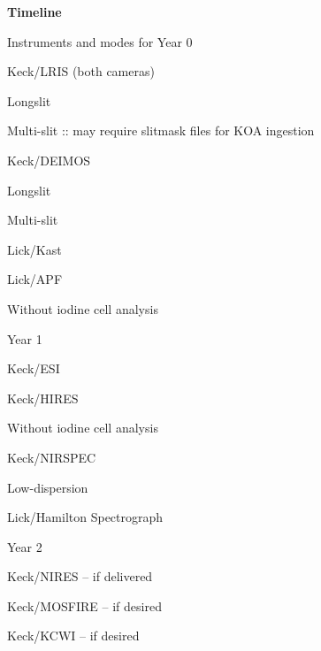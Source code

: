 \documentclass[11pt,preprint]{aastex}
\newenvironment{my_itemize}{
\begin{itemize}
  \setlength{\itemsep}{1pt}
  \setlength{\parskip}{0pt}
  \setlength{\parsep}{0pt}}{\end{itemize}
}
\newenvironment{my_enumerate}{
\begin{enumerate}
  \setlength{\itemsep}{1pt}
  \setlength{\parskip}{0pt}
  \setlength{\parsep}{0pt}}{\end{enumerate}
}
\begin{document}
\vskip 0.2in

\begin{center}
{\bf Timeline}
\end{center}

\begin{my_enumerate}
\item Instruments and modes for Year 0
  \begin{my_itemize}
  \item Keck/LRIS (both cameras)
    \begin{my_itemize}
    \item Longslit
    \item Multi-slit :: may require slitmask files for KOA ingestion
    \end{my_itemize}
  \item Keck/DEIMOS
    \begin{my_itemize}
    \item Longslit
    \item Multi-slit 
    \end{my_itemize}
  \item Lick/Kast
  \item Lick/APF
    \begin{my_itemize}
    \item Without iodine cell analysis
    \end{my_itemize}
  \end{my_itemize}
\item Year 1
  \begin{my_itemize}
  \item Keck/ESI
  \item Keck/HIRES
    \begin{my_itemize}
    \item Without iodine cell analysis
    \end{my_itemize}
  \item Keck/NIRSPEC
    \begin{my_itemize}
    \item Low-dispersion
    \end{my_itemize}
  \item Lick/Hamilton Spectrograph
  \end{my_itemize}
\item Year 2
  \begin{my_itemize}
  \item Keck/NIRES -- if delivered
  \item Keck/MOSFIRE -- if desired
  \item Keck/KCWI -- if desired
  \end{my_itemize}
\end{my_enumerate}
\end{document}
